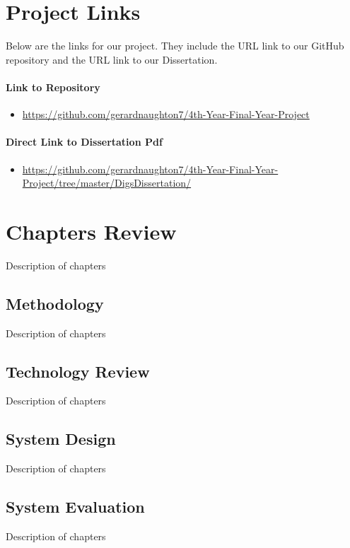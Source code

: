 \section{Project Links}
Below are the links for our project. They include the URL link to our GitHub repository and the URL link to our Dissertation.

\paragraph{Link to Repository}
\begin{itemize}
\item \href{https://github.com/gerardnaughton7/4th-Year-Final-Year-Project}{https://github.com/gerardnaughton7/4th-Year-Final-Year-Project} 
\end{itemize}

\paragraph{Direct Link to Dissertation Pdf}
\begin{itemize}
    \item \href{https://github.com/gerardnaughton7/4th-Year-Final-Year-Project/tree/master/DigsDissertation/}{https://github.com/gerardnaughton7/4th-Year-Final-Year-Project/tree/master/DigsDissertation/}
\end{itemize}

\section{Chapters Review}
Description of chapters

\subsection{Methodology}
Description of chapters

\subsection{Technology Review}
Description of chapters

\subsection{System Design}
Description of chapters

\subsection{System Evaluation}
Description of chapters


